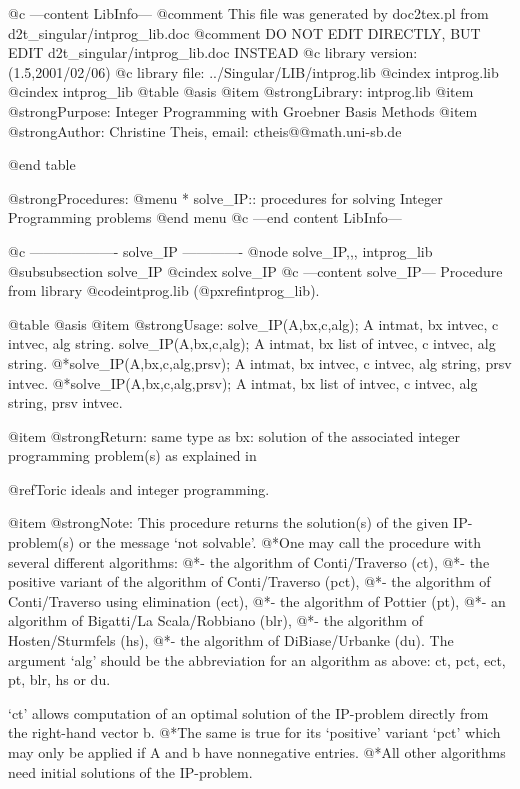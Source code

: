 @c ---content LibInfo---
@comment This file was generated by doc2tex.pl from d2t_singular/intprog_lib.doc
@comment DO NOT EDIT DIRECTLY, BUT EDIT d2t_singular/intprog_lib.doc INSTEAD
@c library version: (1.5,2001/02/06)
@c library file: ../Singular/LIB/intprog.lib
@cindex intprog.lib
@cindex intprog_lib
@table @asis
@item @strong{Library:}
intprog.lib
@item @strong{Purpose:}
      Integer Programming with Groebner Basis Methods
@item @strong{Author:}
Christine Theis, email: ctheis@@math.uni-sb.de

@end table

@strong{Procedures:}
@menu
* solve_IP:: procedures for solving Integer Programming problems
@end menu
@c ---end content LibInfo---

@c ------------------- solve_IP -------------
@node solve_IP,,, intprog_lib
@subsubsection solve_IP
@cindex solve_IP
@c ---content solve_IP---
Procedure from library @code{intprog.lib} (@pxref{intprog_lib}).

@table @asis
@item @strong{Usage:}
solve_IP(A,bx,c,alg); A intmat, bx intvec, c intvec, alg string.
solve_IP(A,bx,c,alg); A intmat, bx list of intvec, c intvec,
alg string.
@*solve_IP(A,bx,c,alg,prsv); A intmat, bx intvec, c intvec,
alg string, prsv intvec.
@*solve_IP(A,bx,c,alg,prsv); A intmat, bx list of intvec, c intvec,
alg string, prsv intvec.

@item @strong{Return:}
same type as bx: solution of the associated integer programming
problem(s) as explained in

   @ref{Toric ideals and integer programming}.

@item @strong{Note:}
This procedure returns the solution(s) of the given IP-problem(s)
or the message `not solvable'.
@*One may call the procedure with several different algorithms:
@*- the algorithm of Conti/Traverso (ct),
@*- the positive variant of the algorithm of Conti/Traverso (pct),
@*- the algorithm of Conti/Traverso using elimination (ect),
@*- the algorithm of Pottier (pt),
@*- an algorithm of Bigatti/La Scala/Robbiano (blr),
@*- the algorithm of Hosten/Sturmfels (hs),
@*- the algorithm of DiBiase/Urbanke (du).
The argument `alg' should be the abbreviation for an algorithm as
above: ct, pct, ect, pt, blr, hs or du.

`ct' allows computation of an optimal solution of the IP-problem
directly from the right-hand vector b.
@*The same is true for its `positive' variant `pct' which may only be
applied if A and b have nonnegative entries.
@*All other algorithms need initial solutions of the IP-problem.

